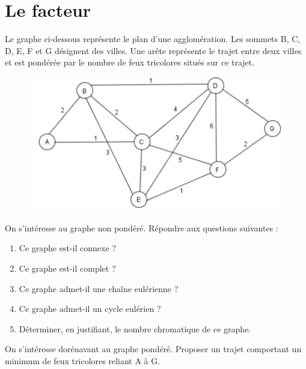 \documentclass{article}[12pt]
\begin{document}
\section{Le facteur}
 Le graphe ci-dessous représente le plan d'une agglomération. Les sommets B, C, D, E, F et G désignent des villes. Une arête représente le trajet entre deux villes et est pondérée par le nombre de feux tricolores situés sur ce trajet. \\

\begin{figure}[h!]
    \centering
    \includegraphics[scale=0.6]{Djisktra.png}
    \label{fig:my_label}
\end{figure}

 On s'intéresse au graphe non pondéré. Répondre aux questions suivantes :
\begin{enumerate}
    \item Ce graphe est-il connexe ?
    \item Ce graphe est-il complet ?
    \item Ce graphe admet-il une chaîne eulérienne ?
    \item Ce graphe admet-il un cycle eulérien ?
    \item Déterminer, en justifiant, le nombre chromatique de ce graphe.
\end{enumerate}
On s'intéresse dorénavant au graphe pondéré. Proposer un trajet comportant un minimum de feux tricolores reliant A à G.
\end{document}
